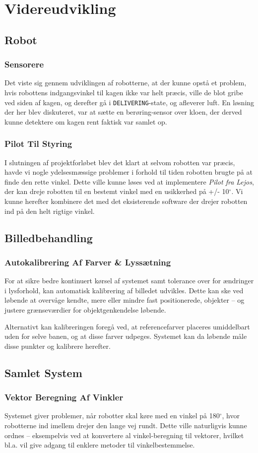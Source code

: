 \chapter{Videreudvikling}
\section{Robot}
\subsection{Sensorere}
Det viste sig gennem udviklingen af robotterne, at der kunne opstå et problem, hvis robottens indgangsvinkel til kagen ikke var helt præcis, ville de blot gribe ved siden af kagen, og derefter gå i \texttt{DELIVERING}-state, og afleverer luft. En løsning der her blev diskuteret, var at sætte en berøring-sensor over kloen, der derved kunne detektere om kagen rent faktisk var samlet op.

\subsection{Pilot Til Styring}
I slutningen af projektforløbet blev det klart at selvom robotten var præcis, havde vi nogle ydelsesmæssige problemer i forhold til tiden robotten brugte på at finde den rette vinkel. Dette ville kunne løses ved at implementere \textit{Pilot fra Lejos}, der kan dreje robotten til en bestemt vinkel med en usikkerhed på +/- 10$^\circ$. Vi kunne herefter kombinere det med det eksisterende software der drejer robotten ind på den helt rigtige vinkel.

\section{Billedbehandling}
\subsection{Autokalibrering Af Farver \& Lyssætning}
For at sikre bedre kontinuert kørsel af systemet samt tolerance over for ændringer i lysforhold, kan automatisk kalibrering af billedet udvikles. Dette kan ske ved løbende at overvåge kendte, mere eller mindre fast positionerede, objekter -- og justere grænseværdier for objektgenkendelse løbende.

Alternativt kan kalibreringen foregå ved, at referencefarver placeres umiddelbart uden for selve banen, og at disse farver udpeges. Systemet kan da løbende måle disse punkter og kalibrere herefter.

\section{Samlet System}
\subsection{Vektor Beregning Af Vinkler}
Systemet giver problemer, når robotter skal køre med en vinkel på 180$^\circ$, hvor robotterne ind imellem drejer den lange vej rundt. Dette ville naturligvis kunne ordnes -- eksempelvis ved at konvertere al vinkel-beregning til vektorer, hvilket bl.a. vil give adgang til enklere metoder til vinkelbestemmelse.